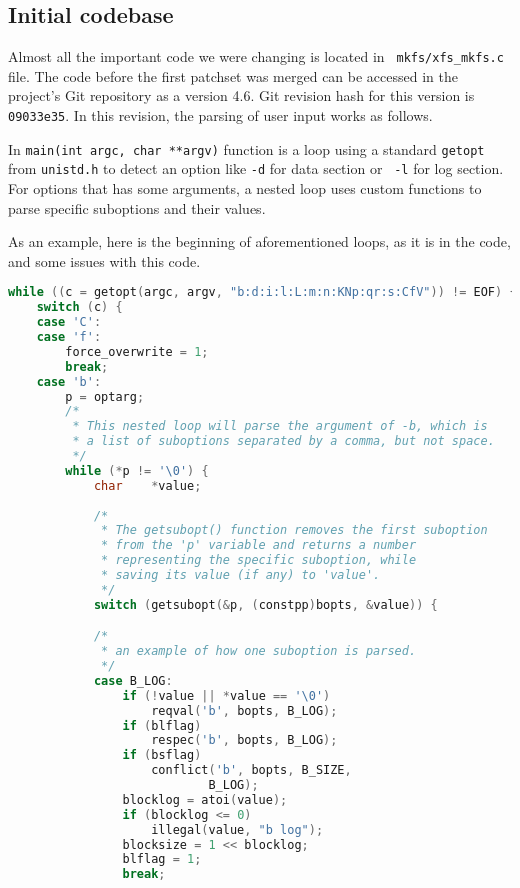 \begin{desciption}
\section{Initial codebase}\label{chap:refactoring:initialcodebase}

Almost all the important code we were changing is located in {\tt
mkfs/xfs\_mkfs.c} file. The code before the first patchset was merged can
be accessed in the project's Git repository as a version 4.6. Git revision
hash for this version is {\tt 09033e35}. In this revision, the parsing of
user input works as follows.

In {\tt main(int argc, char **argv)} function is a loop using a
standard {\tt getopt} from {\tt unistd.h} to detect an option like {\tt -d} for data section or {\tt
-l} for log section. For options that has some arguments, a nested loop uses custom functions to
parse specific suboptions and their values.

As an example, here is the beginning of aforementioned loops, as it is in
the code, and some issues with this code.

\begin{lstlisting}[frame=none, basicstyle=\footnotesize\ttfamily,
language=C, numbers=none, numberstyle=\tiny\color{black},
caption= {Part of option-parsing loop from mkfs.xfs with additional
comments.},
label={lst:refactoring:loopexample}]
while ((c = getopt(argc, argv, "b:d:i:l:L:m:n:KNp:qr:s:CfV")) != EOF) {
	switch (c) {
	case 'C':
	case 'f':
		force_overwrite = 1;
		break;
	case 'b':
		p = optarg;
		/*
		 * This nested loop will parse the argument of -b, which is
		 * a list of suboptions separated by a comma, but not space.
		 */
		while (*p != '\0') {
			char	*value;
			
			/*
			 * The getsubopt() function removes the first suboption
			 * from the 'p' variable and returns a number
			 * representing the specific suboption, while
			 * saving its value (if any) to 'value'.
			 */
			switch (getsubopt(&p, (constpp)bopts, &value)) {

			/*
			 * an example of how one suboption is parsed.
			 */
			case B_LOG:
				if (!value || *value == '\0')
					reqval('b', bopts, B_LOG);
				if (blflag)
					respec('b', bopts, B_LOG);
				if (bsflag)
					conflict('b', bopts, B_SIZE,
							B_LOG);
				blocklog = atoi(value);
				if (blocklog <= 0)
					illegal(value, "b log");
				blocksize = 1 << blocklog;
				blflag = 1;
				break;
\end{lstlisting}


\end{desciption}
